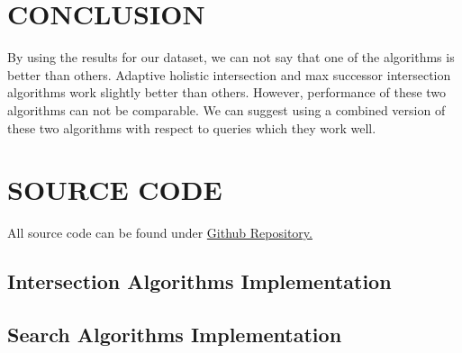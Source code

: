 \documentclass[paper=a4, fontsize=11pt]{scrartcl} %
\numberwithin{equation}{section} %
\numberwithin{figure}{section} %
\numberwithin{table}{section} %
\begin{document}
\section{CONCLUSION}
By using the results for our dataset, we can not say that one of the algorithms is better than others. Adaptive holistic intersection and max successor intersection algorithms work slightly better than others. However, performance of these two algorithms can not be comparable. We  can suggest using a combined version of these two algorithms with respect to queries which they work well.


\newpage
\section{SOURCE CODE}

All source code can be found under  \href{https://github.com/ozgurgundogan/Efficient-set-intersection-for-inverted-indexing}{Github Repository.}


\subsection{Intersection Algorithms Implementation}


\newpage
\subsection{Search Algorithms Implementation}

\end{document}
